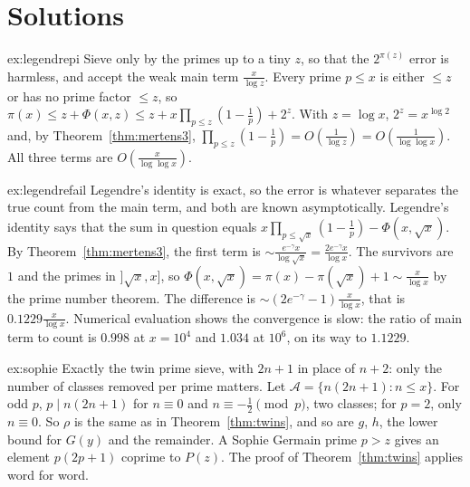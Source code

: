 \section{Solutions}

\begin{solution}{ex:legendrepi}
\idea Sieve only by the primes up to a tiny $z$, so that the $2^{\pi(z)}$ error is harmless, and accept the weak main term $\frac x{\log z}$.
\writeup Every prime $p\le x$ is either $\le z$ or has no prime factor $\le z$, so $\pi(x)\le z+\Phi(x,z)\le z+x\prod_{p\le z}(1-\frac1p)+2^z$. With $z=\log x$, $2^z=x^{\log2}$ and, by Theorem~\ref{thm:mertens3},
$\prod_{p\le z}(1-\frac1p)=O(\frac1{\log z})=O(\frac1{\log\log x})$. All three terms are $O(\frac x{\log\log x})$.
\end{solution}

\begin{solution}{ex:legendrefail}
\idea Legendre's identity is exact, so the error is whatever separates the true count from the main term, and both are known asymptotically.
\writeup Legendre's identity says that the sum in question equals $x\prod_{p\le\sqrt x}(1-\frac1p)-\Phi(x,\sqrt x)$. By Theorem~\ref{thm:mertens3}, the first term is $\sim\frac{e^{-\gamma}x}{\log\sqrt x}=\frac{2e^{-\gamma}x}{\log x}$. The survivors are $1$ and
the primes in $]\sqrt x,x]$, so $\Phi(x,\sqrt x)=\pi(x)-\pi(\sqrt x)+1\sim\frac x{\log x}$ by the prime number theorem. The difference is $\sim(2e^{-\gamma}-1)\frac x{\log x}$, that is $0.1229\frac x{\log x}$. Numerical evaluation shows the convergence
is slow: the ratio of main term to count is $0.998$ at $x=10^4$ and $1.034$ at $10^6$, on its way to $1.1229$.
\end{solution}

\begin{solution}{ex:sophie}
\idea Exactly the twin prime sieve, with $2n+1$ in place of $n+2$: only the number of classes removed per prime matters.
\writeup Let $\mathcal A=\{n(2n+1):n\le x\}$. For odd $p$, $p\mid n(2n+1)$ for $n\equiv0$ and $n\equiv-\frac12\pmod p$, two classes; for $p=2$, only $n\equiv0$. So $\rho$ is the same as in Theorem~\ref{thm:twins}, and so are $g$,
$h$, the lower bound for $G(y)$ and the remainder. A Sophie Germain prime $p>z$ gives an element $p(2p+1)$ coprime to $P(z)$. The proof of Theorem~\ref{thm:twins} applies word for word.
\end{solution}


